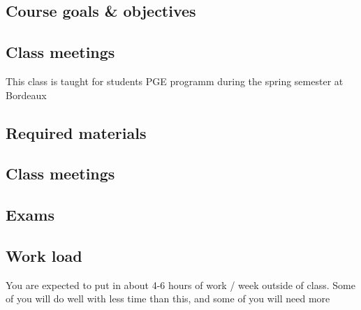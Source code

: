 \documentclass[
  letterpaper,
  DIV=11,
  numbers=noendperiod]{scrreprt}
\begin{document}
\subsection{Course goals \& objectives}\label{course-goals-objectives}

\subsection{Class meetings}\label{class-meetings}

This class is taught for students PGE programm during the spring
semester at Bordeaux

\subsection{Required materials}\label{required-materials}

\subsection{Class meetings}\label{class-meetings-1}

\subsection{Exams}\label{exams}

\subsection{Work load}\label{work-load}

You are expected to put in about 4-6 hours of work / week outside of
class. Some of you will do well with less time than this, and some of
you will need more
\end{document}
